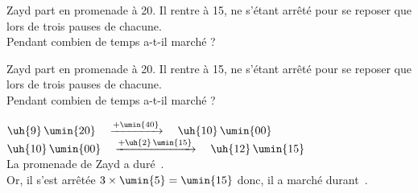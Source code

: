 
\begin{exercice}
    Zayd part en promenade à  20. Il rentre à 15, ne s'étant arrêté pour se reposer que lors de trois pauses de  chacune. \\
    Pendant combien de temps a-t-il marché ?

 \end{exercice}
 
 \begin{corrige}
    Zayd part en promenade à  20. Il rentre à 15, ne s'étant arrêté pour se reposer que lors de trois pauses de  chacune. \\
    Pendant combien de temps a-t-il marché ?

    {\red
    $\uh{9}\,\umin{20} \quad \xrightarrow{+\umin{40}} \quad \uh{10}\,\umin{00}$ \\
    $\uh{10}\,\umin{00} \quad \xrightarrow{+\uh{2} \, \umin{15}} \quad \uh{12}\,\umin{15}$ \\
    La promenade de Zayd a duré \,. \\
    Or, il s'est arrêtée $3\times\umin{5} =\umin{15}$ donc, il a marché durant \,.
    }
 \end{corrige}